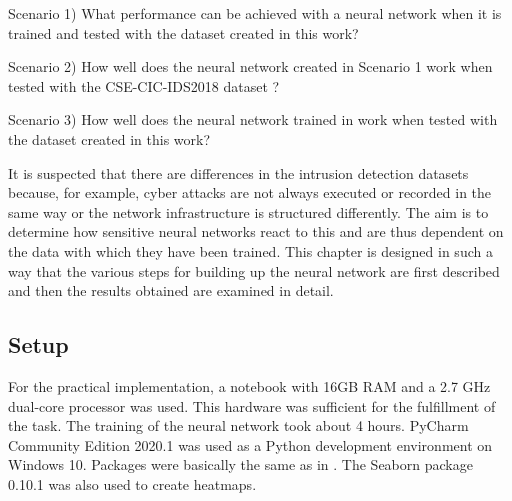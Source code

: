 \documentclass[conference]{IEEEtran}
\begin{document}
Scenario 1) What performance can be achieved with a neural network when it is trained and tested with the dataset created in this work? 
\smallskip

Scenario 2) How well does the neural network created in Scenario 1 work when tested with the CSE-CIC-IDS2018 dataset  \cite{max2}? 
\smallskip

Scenario 3) How well does the neural network trained in \cite{max1} work when tested with the dataset created in this work?
\smallskip

It is suspected that there are differences in the intrusion detection datasets because, for example, cyber attacks are not always executed or recorded in the same way or the network infrastructure is structured differently. The aim is to determine how sensitive neural networks react to this and are thus dependent on the data with which they have been trained. This chapter is designed in such a way that the various steps for building up the neural network are first described and then the results obtained are examined in detail.

\subsection{Setup}
For the practical implementation, a notebook with 16GB RAM and a 2.7 GHz dual-core processor was used. This hardware was sufficient for the fulfillment of the task. The training of the neural network took about 4 hours. PyCharm Community Edition 2020.1 was used as a Python development environment on Windows 10. Packages were basically the same as in \cite{max1}. The Seaborn package 0.10.1 was also used to create heatmaps.
\end{document}

